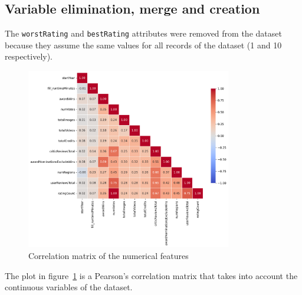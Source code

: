 \subsection{Variable elimination, merge and creation}\label{sec:var_elim_creation}
The \texttt{worstRating} and \texttt{bestRating} attributes were removed from the dataset because they
assume the same values for all records of the dataset (1 and 10 respectively).\\


\begin{figure}[H]
    \centering
    \includegraphics[width=0.8\textwidth]{plots/correlation_matrix.png}
    \caption{Correlation matrix of the numerical features}
    \label{fig:correlation_matrix}
\end{figure}

The plot in figure~\ref{fig:correlation_matrix} is a Pearson's correlation matrix that takes into
account the continuous variables of the dataset.\\

